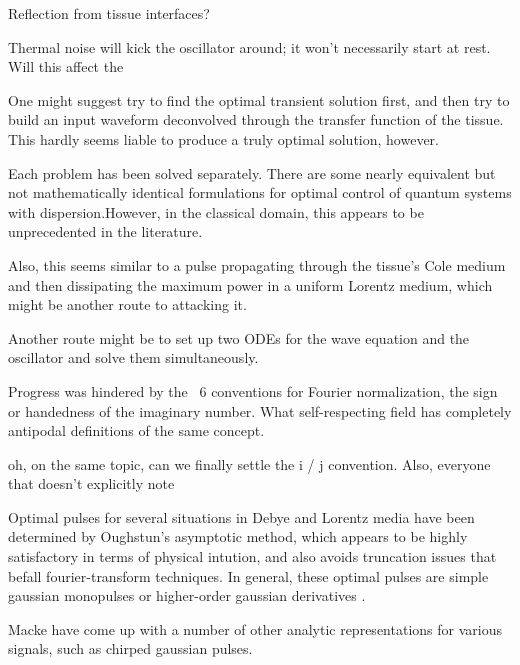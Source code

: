 \documentclass[paper.tex]{subfiles}
\begin{document}
\begin{autem}
Reflection from tissue interfaces?

Thermal noise will kick the oscillator around; it won't necessarily start at rest. Will this affect the 
\end{autem}

One might suggest try to find the optimal transient solution first, and then try to build an input waveform deconvolved through the  transfer function of the tissue. This hardly seems liable to produce a truly optimal solution, however.

Each problem has been solved separately. There are some nearly equivalent but not mathematically identical formulations for optimal control of quantum systems with dispersion.\footnotemark However, in the classical domain, this appears to be unprecedented in the literature.


Also, this seems similar to a pulse propagating through the tissue's Cole medium and then dissipating the maximum power in a uniform Lorentz medium, which might be another route to attacking it.

Another route might be to set up two ODEs for the wave equation and the oscillator and solve them simultaneously.

Progress was hindered by the ~6 conventions for Fourier normalization, the sign or handedness of the imaginary number. What self-respecting field has completely antipodal definitions of the same concept.

oh, on the same topic, can we finally settle the i / j convention. Also, everyone that doesn't explicitly note  

Optimal pulses for several situations in Debye and Lorentz media have been determined by Oughstun's asymptotic method, which appears to be highly satisfactory in terms of physical intution, and also avoids truncation issues that befall fourier-transform techniques. In general, these optimal pulses are simple gaussian monopulses or higher-order gaussian derivatives \cite{Optimal2017} \cite{Optimal2015}. 

Macke \cite{Simple2012} have come up with a number of other analytic representations for various signals, such as chirped gaussian pulses.


\printendnotes
\end{document}

